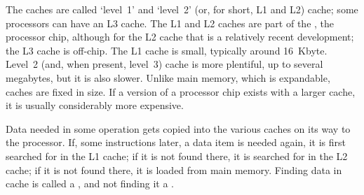 The caches are called `level~1' and `level~2' (or, for short, L1 and
L2) cache; some processors can have an L3 cache.  The L1 and L2 caches
are part of the , the processor chip, although for the
L2 cache that is a relatively recent development; the L3 cache is
off-chip.  The L1 cache is small, typically around 16~Kbyte.
Level~2 (and, when present, level~3) cache is more plentiful,
up to several
megabytes, but it is also slower.  Unlike main memory, which is
expandable, caches are fixed in size. If a version of a processor chip
exists with a larger cache, it is usually considerably more expensive.

Data needed in some operation gets copied into the various
caches on its way to the processor. If, some instructions later, a
data item is needed again, it is first searched for in the L1 cache; if it is
not found there, it is searched for in the L2 cache; if it is not found there,
it is loaded from main memory. Finding data in cache is called a
, and not finding it a .

